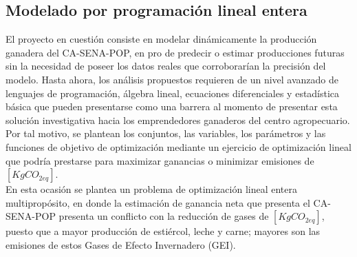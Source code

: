 \subsection{Modelado por programación lineal entera} \label{linprogmod}
El proyecto en cuestión consiste en modelar dinámicamente la producción ganadera del CA-SENA-POP, en pro de predecir o estimar producciones futuras sin la necesidad de poseer los datos reales que corroborarían la precisión del modelo. Hasta ahora, los análisis propuestos requieren de un nivel avanzado de lenguajes de programación, álgebra lineal, ecuaciones diferenciales y estadística básica que pueden presentarse como una barrera al momento de presentar esta solución investigativa hacia los emprendedores ganaderos del centro agropecuario. Por tal motivo, se plantean los conjuntos, las variables, los parámetros y las funciones de objetivo de optimización mediante un ejercicio de optimización lineal que podría prestarse para maximizar ganancias o minimizar emisiones de $[KgCO_{2eq}]$. \\

En esta ocasión se plantea un problema de optimización lineal entera multipropósito, en donde la estimación de ganancia neta que presenta el CA-SENA-POP presenta un conflicto con la reducción de gases de $[KgCO_{2eq}]$, puesto que a mayor producción de estiércol, leche y carne; mayores son las emisiones de estos Gases de Efecto Invernadero (GEI).\\




